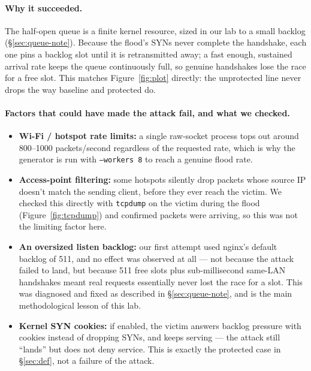 \documentclass[11pt,a4paper]{article}
\begin{document}
\paragraph{Why it succeeded.} The half-open queue is a finite kernel
resource, sized in our lab to a small backlog (\S\ref{sec:queue-note}).
Because the flood's SYNs never complete the handshake, each one pins a
backlog slot until it is retransmitted away; a fast enough, sustained arrival
rate keeps the queue continuously full, so genuine handshakes lose the race
for a free slot. This matches Figure~\ref{fig:plot} directly: the unprotected
line never drops the way baseline and protected do.

\paragraph{Factors that could have made the attack fail, and what we checked.}
\begin{itemize}[nosep]
  \item \textbf{Wi-Fi / hotspot rate limits:} a single raw-socket process
    tops out around 800--1000 packets/second regardless of the requested
    rate, which is why the generator is run with \texttt{--workers 8} to
    reach a genuine flood rate.
  \item \textbf{Access-point filtering:} some hotspots silently drop packets
    whose source IP doesn't match the sending client, before they ever reach
    the victim. We checked this directly with \texttt{tcpdump} on the victim
    during the flood (Figure~\ref{fig:tcpdump}) and confirmed packets were
    arriving, so this was not the limiting factor here.
  \item \textbf{An oversized listen backlog:} our first attempt used nginx's
    default backlog of 511, and no effect was observed at all --- not because
    the attack failed to land, but because 511 free slots plus sub-millisecond
    same-LAN handshakes meant real requests essentially never lost the race
    for a slot. This was diagnosed and fixed as described in
    \S\ref{sec:queue-note}, and is the main methodological lesson of this lab.
  \item \textbf{Kernel SYN cookies:} if enabled, the victim answers backlog
    pressure with cookies instead of dropping SYNs, and keeps serving --- the
    attack still ``lands'' but does not deny service. This is exactly the
    protected case in \S\ref{sec:def}, not a failure of the attack.
\end{itemize}
\end{document}
